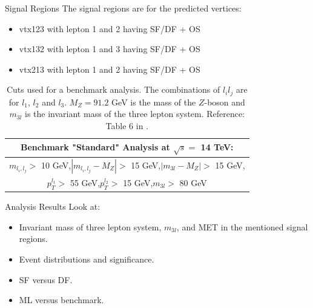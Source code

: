 \documentclass[notes]{beamer}
\begin{document}
	\begin{frame}[t]{Signal Regions}
		The signal regions are for the predicted vertices:
		\begin{itemize}
			\item vtx123 with lepton 1 and 2 having SF/DF + OS
			\item vtx132 with lepton 1 and 3 having SF/DF + OS
			\item vtx213 with lepton 1 and 2 having SF/DF + OS
		\end{itemize}
	
		\begin{table}[ht!]
			\centering
			\begin{tabular}{|c|}
				\hline \rule{0pt}{13pt}
				\textbf{Benchmark "Standard" Analysis at $\sqrt{s}=$ 14 TeV:}\\
				\hline \rule{0pt}{13pt}
				$m_{l_i,l_j}>$ 10 GeV,\quad $|m_{l_i,l_j}-M_Z|>$ 15 GeV,\quad $|m_{3l}-M_Z|>$ 15 GeV,\\
				$p_T^{l_1}>$ 55 GeV,\quad $p_T^{l_2}>$ 15 GeV,\quad $m_{3l}>$ 80 GeV\\
				\hline
			\end{tabular}
			\caption{Cuts used for a benchmark analysis. The combinations of $l_il_j$ are for $l_1$, $l_2$ and $l_3$. $M_Z=91.2$ GeV is the mass of the $Z$-boson and $m_{3l}$ is the invariant mass of the three lepton system. Reference: Table 6 in \citet{inverseseesaw}.}
			\label{tab:Cuts_Benchmark}
		\end{table}
	\end{frame}


	\begin{frame}[t]{Analysis Results}
		Look at:
		\begin{itemize}
			\item Invariant mass of three lepton system, $m_{3l}$, and MET in the mentioned signal regions.
			\item Event distributions and significance.
			\item SF versus DF.
			\item ML versus benchmark.
		\end{itemize}
	\end{frame}
\end{document}

